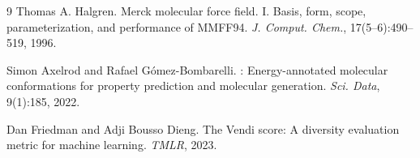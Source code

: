 \documentclass{article}
\begin{document}
\begin{thebibliography}{9}
Thomas A. Halgren.
\newblock Merck molecular force field. {I}. Basis, form, scope, parameterization, and performance of {MMFF94}.
\newblock \emph{J. Comput. Chem.}, 17(5--6):490--519, 1996.

Simon Axelrod and Rafael G{\'o}mez-Bombarelli.
: Energy-annotated molecular conformations for property prediction and molecular generation.
\newblock \emph{Sci. Data}, 9(1):185, 2022.

Dan Friedman and Adji Bousso Dieng.
\newblock The Vendi score: A diversity evaluation metric for machine learning.
\newblock \emph{TMLR}, 2023.

\end{thebibliography}
\end{document}
